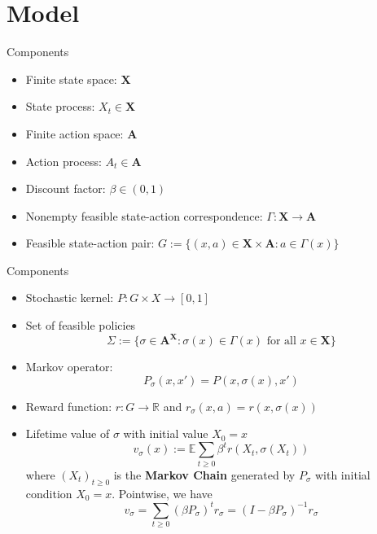 \section{Model}

\begin{frame}{Components}
    \begin{itemize}
        \item Finite state space:  $\mathbf{X}$
        \item State process:  $X_t\in \mathbf{X}$
        \item Finite action space:  $\mathbf{A}$ 
        \item  Action process:  $A_t\in \mathbf{A}$
        \item Discount factor:  $\beta\in(0,1)$
        \item Nonempty feasible state-action correspondence: $\Gamma: \mathbf{X}\to \mathbf{A}$
        \item Feasible state-action pair: $G:=\{(x,a)\in \mathbf{X}\times\mathbf{A}: a\in\Gamma(x)\}$
    \end{itemize}
\end{frame}

\begin{frame}{Components}
    \begin{itemize}
        \item Stochastic kernel: $P:G\times X\to [0,1]$
        \item Set of feasible policies 
        $$
        \Sigma:=\{\sigma\in \mathbf{A}^{\mathbf{X}}: \sigma(x) \in \Gamma(x)\text{ for all $x\in \mathbf{X}$}\}
        $$
        \item Markov operator: 
        $$
        P_\sigma (x,x') = P(x,\sigma(x),x')
        $$
        \item Reward function: $r:G\to \mathbb{R}$ and $r_\sigma(x,a) = r(x,\sigma(x))$
        \item Lifetime value of $\sigma$ with initial value $X_0=x$
        $$
        v_\sigma (x) := \mathbb{E}\sum_{t\ge 0} \beta^t r(X_t,\sigma(X_t))
        $$
        where $(X_t)_{t\ge 0}$ is the \textbf{Markov Chain} generated by $P_\sigma$ with initial condition $X_0=x$. Pointwise, we have
        $$
        v_\sigma  = \sum_{t\ge 0} (\beta P_\sigma)^tr_\sigma  = (I-\beta P_\sigma)^{-1}r_\sigma
        $$
    \end{itemize}
\end{frame}